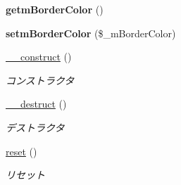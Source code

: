 \begin{DoxyCompactItemize}
\item 
{\bfseries getm\+Border\+Color} ()\hypertarget{class_reversi_setting_a91454a61fd72638be2703907a8f81a75}{}\label{class_reversi_setting_a91454a61fd72638be2703907a8f81a75}

\item 
{\bfseries setm\+Border\+Color} (\$\+\_\+m\+Border\+Color)\hypertarget{class_reversi_setting_a59c73e106597e9e52ad6f531f7de2ffd}{}\label{class_reversi_setting_a59c73e106597e9e52ad6f531f7de2ffd}

\item 
\hyperlink{class_reversi_setting_a095c5d389db211932136b53f25f39685}{\+\_\+\+\_\+construct} ()
\begin{DoxyCompactList}\small\item\em コンストラクタ \end{DoxyCompactList}\item 
\hyperlink{class_reversi_setting_a421831a265621325e1fdd19aace0c758}{\+\_\+\+\_\+destruct} ()
\begin{DoxyCompactList}\small\item\em デストラクタ \end{DoxyCompactList}\item 
\hyperlink{class_reversi_setting_a4a20559544fdf4dcb457e258dc976cf8}{reset} ()
\begin{DoxyCompactList}\small\item\em リセット \end{DoxyCompactList}\end{DoxyCompactItemize}
